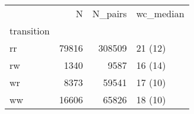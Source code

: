 \begin{tabular}{lrrl}
\toprule
{} &      N &  N\_pairs & wc\_median \\
transition &        &          &           \\
\midrule
rr         &  79816 &   308509 &   21 (12) \\
rw         &   1340 &     9587 &   16 (14) \\
wr         &   8373 &    59541 &   17 (10) \\
ww         &  16606 &    65826 &   18 (10) \\
\bottomrule
\end{tabular}
